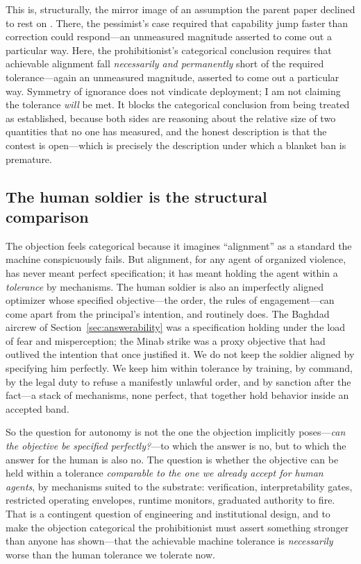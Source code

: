 \documentclass[11pt]{article}
\begin{document}
This is, structurally, the mirror image of an assumption the parent paper declined to rest on \citep{penumbra2026}. There, the pessimist's case required that capability jump faster than correction could respond---an unmeasured magnitude asserted to come out a particular way. Here, the prohibitionist's categorical conclusion requires that achievable alignment fall \emph{necessarily and permanently} short of the required tolerance---again an unmeasured magnitude, asserted to come out a particular way. Symmetry of ignorance does not vindicate deployment; I am not claiming the tolerance \emph{will} be met. It blocks the categorical conclusion from being treated as established, because both sides are reasoning about the relative size of two quantities that no one has measured, and the honest description is that the contest is open---which is precisely the description under which a blanket ban is premature.

\subsection{The human soldier is the structural comparison}

The objection feels categorical because it imagines ``alignment'' as a standard the machine conspicuously fails. But alignment, for any agent of organized violence, has never meant perfect specification; it has meant holding the agent within a \emph{tolerance} by mechanisms. The human soldier is also an imperfectly aligned optimizer whose specified objective---the order, the rules of engagement---can come apart from the principal's intention, and routinely does. The Baghdad aircrew of Section~\ref{sec:answerability} was a specification holding under the load of fear and misperception; the Minab strike was a proxy objective that had outlived the intention that once justified it. We do not keep the soldier aligned by specifying him perfectly. We keep him within tolerance by training, by command, by the legal duty to refuse a manifestly unlawful order, and by sanction after the fact---a stack of mechanisms, none perfect, that together hold behavior inside an accepted band.

So the question for autonomy is not the one the objection implicitly poses---\emph{can the objective be specified perfectly?}---to which the answer is no, but to which the answer for the human is also no. The question is whether the objective can be held within a tolerance \emph{comparable to the one we already accept for human agents}, by mechanisms suited to the substrate: verification, interpretability gates, restricted operating envelopes, runtime monitors, graduated authority to fire. That is a contingent question of engineering and institutional design, and to make the objection categorical the prohibitionist must assert something stronger than anyone has shown---that the achievable machine tolerance is \emph{necessarily} worse than the human tolerance we tolerate now.
\end{document}

